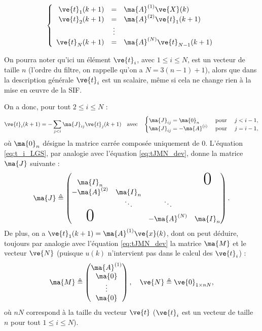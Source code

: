 \begin{equation*}
\left \{
\begin{array}{rcl}
\ve{t}_1(k+1) & = & \ma{A}^{(1)}\ve{X}(k)\\
\ve{t}_2(k+1) & = & \ma{A}^{(2)}\ve{t}_1(k+1) \\
 & \vdots &  \\
\ve{t}_N(k+1)& = & \ma{A}^{(N)}\ve{t}_{N-1}(k+1)\\
\end{array}
\right .
\end{equation*}

\begin{rmq}
On pourra noter qu'ici un élément $\ve{t}_i$, avec $1\leq i \leq N$, est un vecteur de taille $n$ (l'ordre du filtre, on rappelle qu'on a $N= 3(n-1)+1$), alors que dans la description générale $\ve{t}_i$ est un scalaire, même si cela ne change rien à la mise en \oe{}uvre de la SIF.
\end{rmq}

On a donc, pour tout $2 \leq i \leq N$ :
\begin{equation}\label{eq:t_i_LGS}
	\ve{t}_i (k+1)= -\sum_{j<i} \ma{J}_{ij} \ve{t}_j(k+1) \quad \text{avec}\quad
	\begin{cases}
		\ma{J}_{ij} = \ma{0}_n &\text{ pour } \quad j<i-1,\\
		\ma{J}_{ij} = -\ma{A}^{(i)} &\text{ pour } \quad j=i-1,
	\end{cases}  
\end{equation}
où $\ma{0}_n$ désigne la matrice carrée composée uniquement de $0$. L'équation \eqref{eq:t_i_LGS}, par analogie avec l'équation \eqref{eq:tJMN_dev}, donne la matrice $\ma{J}$ suivante :
\begin{equation}
	\ma{J}\triangleq \begin{pmatrix}
		\ma{I}_n &  &  & \text{\Huge 0} \\
		-\ma{A}^{(2)}& \ma{I}_n & & \\
		  & \ddots & \ddots & \\
		\text{\Huge 0} &  & -\ma{A}^{(N)} & \ma{I}_n \\
	\end{pmatrix}.
\end{equation}
De plus, on a $\ve{t}_1(k+1) = \ma{A}^{(1)}\ve{x}(k)$, dont on peut déduire, toujours par analogie avec l'équation \eqref{eq:tJMN_dev} la matrice $\ma{M}$ et le vecteur $\ve{N}$ (puisque $u(k)$ n'intervient pas dans le calcul des $\ve{t}_i$) : 
\begin{equation}
	\ma{M}\triangleq \begin{pmatrix}
		\ma{A}^{(1)}\\
		\ma{0}\\
		\vdots\\
		\ma{0} \\
	\end{pmatrix}, \quad
	\ve{N}\triangleq \ve{0}_{1\times nN},
\end{equation}
où $nN$ correspond à la taille du vecteur $\ve{t}$ ($\ve{t}_i$ est un vecteur de taille $n$ pour tout $1\leq i \leq N$).

